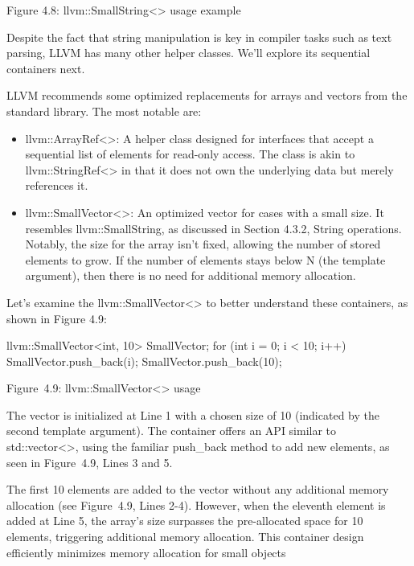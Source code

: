 \begin{center}
Figure 4.8: llvm::SmallString<> usage example
\end{center}

Despite the fact that string manipulation is key in compiler tasks such as text parsing, LLVM has many other helper classes. We'll explore its sequential containers next.


LLVM recommends some optimized replacements for arrays and vectors from the standard library. The most notable are:

\begin{itemize}
\item
llvm::ArrayRef<>: A helper class designed for interfaces that accept a sequential list of elements for read-only access. The class is akin to llvm::StringRef<> in that it does not own the underlying data but merely references it.

\item
llvm::SmallVector<>: An optimized vector for cases with a small size. It resembles llvm::SmallString, as discussed in Section 4.3.2, String operations. Notably, the size for the array isn't fixed, allowing the number of stored elements to grow. If the number of elements stays below N (the template argument), then there is no need for additional memory allocation.
\end{itemize}

Let's examine the llvm::SmallVector<> to better understand these containers, as shown in Figure 4.9:

\begin{cpp}
llvm::SmallVector<int, 10> SmallVector;
for (int i = 0; i < 10; i++) {
  SmallVector.push_back(i);
}
SmallVector.push_back(10);
\end{cpp}

\begin{center}
Figure 4.9: llvm::SmallVector<> usage
\end{center}

The vector is initialized at Line 1 with a chosen size of 10 (indicated by the second template argument). The container offers an API similar to std::vector<>, using the familiar push\_back method to add new elements, as seen in Figure 4.9, Lines 3 and 5.

The first 10 elements are added to the vector without any additional memory allocation (see Figure 4.9, Lines 2-4). However, when the eleventh element is added at Line 5, the array's size surpasses the pre-allocated space for 10 elements, triggering additional memory allocation. This container design efficiently minimizes memory allocation for small objects

